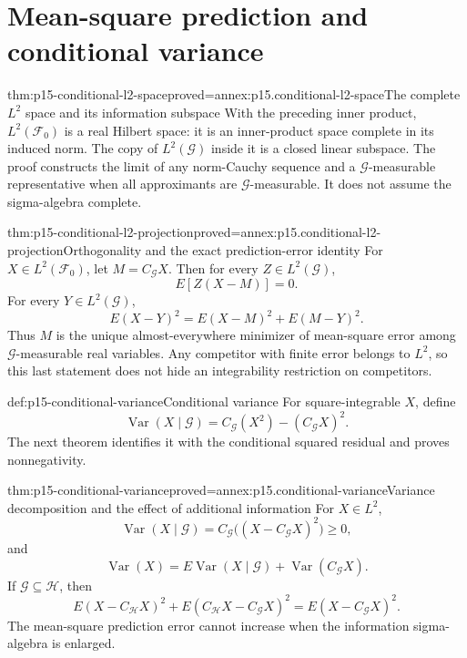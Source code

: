 \section{Mean-square prediction and conditional variance}
\label{sec:p15-conditional-projection}

\begin{hbtheorem}{thm:p15-conditional-l2-space}{proved=annex:p15.conditional-l2-space}{The complete \(L^2\) space and its information subspace}
With the preceding inner product, \(L^2(\mathcal F_0)\) is a real
Hilbert space: it is an inner-product space complete in its induced norm.
The copy of \(L^2(\mathcal G)\) inside it is a closed linear subspace.
The proof constructs the limit of any norm-Cauchy sequence and a
\(\mathcal G\)-measurable representative when all approximants are
\(\mathcal G\)-measurable. It does not assume the sigma-algebra complete.
\end{hbtheorem}

\begin{hbtheorem}{thm:p15-conditional-l2-projection}{proved=annex:p15.conditional-l2-projection}{Orthogonality and the exact prediction-error identity}
For \(X\in L^2(\mathcal F_0)\), let \(M=C_{\mathcal G}X\).
Then for every \(Z\in L^2(\mathcal G)\),
\[
                           E[Z(X-M)]=0.
\]
For every \(Y\in L^2(\mathcal G)\),
\[
                  E(X-Y)^2=E(X-M)^2+E(M-Y)^2.
\]
Thus \(M\) is the unique almost-everywhere minimizer of mean-square
error among \(\mathcal G\)-measurable real variables. Any competitor
with finite error belongs to \(L^2\), so this last statement does not
hide an integrability restriction on competitors.
\end{hbtheorem}

\begin{hbdefinition}{def:p15-conditional-variance}{Conditional variance}
For square-integrable \(X\), define
\[
 \operatorname{Var}(X\mid\mathcal G)
       =C_{\mathcal G}(X^2)-(C_{\mathcal G}X)^2.
\]
The next theorem identifies it with the conditional squared residual and
proves nonnegativity.
\end{hbdefinition}

\begin{hbtheorem}{thm:p15-conditional-variance}{proved=annex:p15.conditional-variance}{Variance decomposition and the effect of additional information}
For \(X\in L^2\),
\[
 \operatorname{Var}(X\mid\mathcal G)
     =C_{\mathcal G}\bigl((X-C_{\mathcal G}X)^2\bigr)\geq0,
\]
and
\[
 \operatorname{Var}(X)
    =E\operatorname{Var}(X\mid\mathcal G)
                      +\operatorname{Var}(C_{\mathcal G}X).
\]
If \(\mathcal G\subseteq\mathcal H\), then
\[
 E(X-C_{\mathcal H}X)^2
   +E(C_{\mathcal H}X-C_{\mathcal G}X)^2
       =E(X-C_{\mathcal G}X)^2.
\]
The mean-square prediction error cannot increase when the information
sigma-algebra is enlarged.
\end{hbtheorem}

